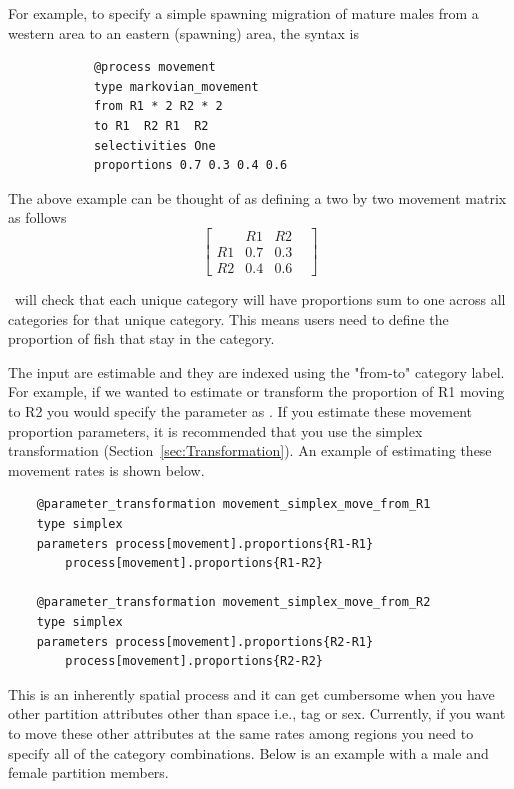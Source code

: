 For example, to specify a simple spawning migration of mature males from a western area to an eastern (spawning) area, the syntax is

{\small{\begin{verbatim}
			@process movement
			type markovian_movement
			from R1 * 2 R2 * 2
			to R1  R2 R1  R2
			selectivities One
			proportions 0.7 0.3 0.4 0.6
\end{verbatim}}}

The above example can be thought of as defining a two by two movement matrix as follows
\[
\begin{bmatrix}
	& R1 & R2 & \\
	R1 & 0.7 & 0.3  \\
	R2 & 0.4  & 0.6 
\end{bmatrix}
\]

\CNAME\ will check that each unique  category will have proportions sum to one across all  categories for that unique  category. This means users need to define the proportion of fish that stay in the  category.

The input  are estimable and they are indexed using the "from-to" category label. For example, if we wanted to estimate or transform the proportion of R1 moving to R2 you would specify the parameter as . If you estimate these movement proportion parameters, it is recommended that you use the simplex transformation (Section~\ref{sec:Transformation}). An example of estimating these movement rates is shown below.

{\small{\begin{verbatim}
	@parameter_transformation movement_simplex_move_from_R1
	type simplex
	parameters process[movement].proportions{R1-R1} 
		process[movement].proportions{R1-R2}
	
	@parameter_transformation movement_simplex_move_from_R2
	type simplex
	parameters process[movement].proportions{R2-R1} 
		process[movement].proportions{R2-R2}			
\end{verbatim}}}

This is an inherently spatial process and it can get cumbersome when you have other partition attributes other than space i.e., tag or sex. Currently, if you want to move these other attributes at the same rates among regions you need to specify all of the category combinations. Below is an example with a male and female partition members.

